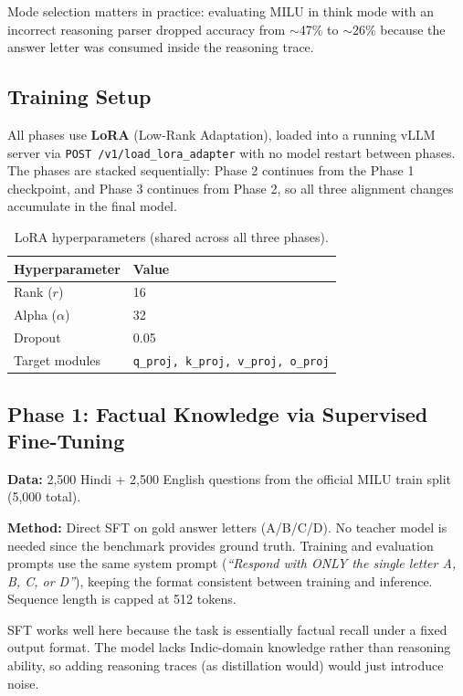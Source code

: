\documentclass[12pt,a4paper]{article}
\begin{document}
Mode selection matters in practice: evaluating MILU in think mode with an incorrect reasoning parser dropped accuracy from $\sim$47\% to $\sim$26\% because the answer letter was consumed inside the reasoning trace.

\subsection{Training Setup}

All phases use \textbf{LoRA} (Low-Rank Adaptation), loaded into a running vLLM server via \texttt{POST /v1/load\_lora\_adapter} with no model restart between phases. The phases are stacked sequentially: Phase 2 continues from the Phase 1 checkpoint, and Phase 3 continues from Phase 2, so all three alignment changes accumulate in the final model.

\begin{table}[h]
\centering
\caption{LoRA hyperparameters (shared across all three phases).}
\begin{tabular}{ll}
\toprule
\textbf{Hyperparameter} & \textbf{Value} \\
\midrule
Rank ($r$)       & 16 \\
Alpha ($\alpha$) & 32 \\
Dropout          & 0.05 \\
Target modules   & \texttt{q\_proj, k\_proj, v\_proj, o\_proj} \\
\bottomrule
\end{tabular}
\end{table}

\subsection{Phase 1: Factual Knowledge via Supervised Fine-Tuning}

\textbf{Data:} 2,500 Hindi + 2,500 English questions from the official MILU train split (5,000 total).

\textbf{Method:} Direct SFT on gold answer letters (A/B/C/D). No teacher model is needed since the benchmark provides ground truth. Training and evaluation prompts use the same system prompt (\textit{``Respond with ONLY the single letter A, B, C, or D''}), keeping the format consistent between training and inference. Sequence length is capped at 512 tokens.

SFT works well here because the task is essentially factual recall under a fixed output format. The model lacks Indic-domain knowledge rather than reasoning ability, so adding reasoning traces (as distillation would) would just introduce noise.
\end{document}
